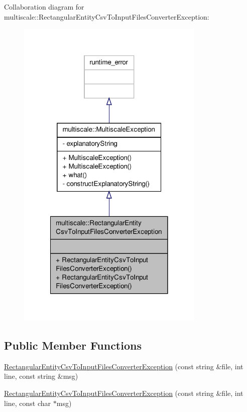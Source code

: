 Collaboration diagram for multiscale\-:\-:Rectangular\-Entity\-Csv\-To\-Input\-Files\-Converter\-Exception\-:\nopagebreak
\begin{figure}[H]
\begin{center}
\leavevmode
\includegraphics[width=254pt]{classmultiscale_1_1RectangularEntityCsvToInputFilesConverterException__coll__graph}
\end{center}
\end{figure}
\subsection*{Public Member Functions}
\begin{DoxyCompactItemize}
\item 
\hyperlink{classmultiscale_1_1RectangularEntityCsvToInputFilesConverterException_a03b6262f19a9816ea13a0ac02994af2b}{Rectangular\-Entity\-Csv\-To\-Input\-Files\-Converter\-Exception} (const string \&file, int line, const string \&msg)
\item 
\hyperlink{classmultiscale_1_1RectangularEntityCsvToInputFilesConverterException_ae62f1ace18cd2ab99c9633978b94b438}{Rectangular\-Entity\-Csv\-To\-Input\-Files\-Converter\-Exception} (const string \&file, int line, const char $\ast$msg)
\end{DoxyCompactItemize}


